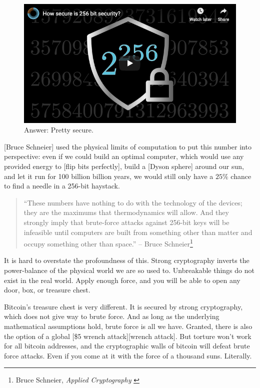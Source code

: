 \begin{figure}
  \includegraphics{assets/images/youtube-vid.png}
  \caption{Answer: Pretty secure.}
  \label{fig:youtube-vid}
\end{figure}

[Bruce Schneier] used the physical limits of computation to put this
number into perspective: even if we could build an optimal computer,
which would use any provided energy to [flip bits perfectly], build a
[Dyson sphere] around our sun, and let it run for 100 billion billion
years, we would still only have a $25\%$ chance to find a needle in a
256-bit haystack.

\begin{quotation}
``These numbers have nothing to do with the technology of the devices;
they are the maximums that thermodynamics will allow. And they
strongly imply that brute-force attacks against 256-bit keys will be
infeasible until computers are built from something other than matter
and occupy something other than space.''
\flushright -- Bruce Schneier\footnote{Bruce Schneier, \textit{Applied Cryptography} \cite{bruce-schneier}}
\end{quotation}

It is hard to overstate the profoundness of this. Strong cryptography
inverts the power-balance of the physical world we are so used to.
Unbreakable things do not exist in the real world. Apply enough force,
and you will be able to open any door, box, or treasure chest.

Bitcoin's treasure chest is very different. It is secured by strong
cryptography, which does not give way to brute force. And as long as the
underlying mathematical assumptions hold, brute force is all we have.
Granted, there is also the option of a global [\$5 wrench attack][wrench attack].
But torture won't work for all bitcoin addresses, and the cryptographic
walls of bitcoin will defeat brute force attacks. Even if you come at it
with the force of a thousand suns. Literally.

